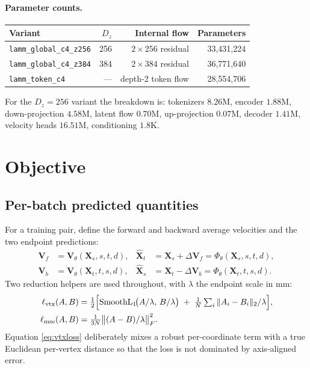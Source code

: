 \documentclass[11pt]{article}
\newcommand{\X}{\bm{X}}
\newcommand{\V}{\bm{V}}
\newcommand{\SL}{\operatorname{SmoothL}_1}
\begin{document}
\paragraph{Parameter counts.}
\begin{center}
\begin{tabular}{lrrr}
\toprule
Variant & $D_z$ & Internal flow & Parameters \\
\midrule
\texttt{lamm\_global\_c4\_z256} & 256 & $2 \times 256$ residual & 33{,}431{,}224 \\
\texttt{lamm\_global\_c4\_z384} & 384 & $2 \times 384$ residual & 36{,}771{,}640 \\
\texttt{lamm\_token\_c4}        & --- & depth-2 token flow      & 28{,}554{,}706 \\
\bottomrule
\end{tabular}
\end{center}
For the $D_z = 256$ variant the breakdown is: tokenizers $8.26$M, encoder $1.88$M,
down-projection $4.58$M, latent flow $0.70$M, up-projection $0.07$M, decoder $1.41$M,
velocity heads $16.51$M, conditioning $1.8$K.

\section{Objective}

\subsection{Per-batch predicted quantities}

For a training pair, define the forward and backward average velocities and the two
endpoint predictions:
\begin{align}
  \V_f &= \V_\theta(\X_s, s, t, d), &
  \widehat{\X}_t &= \X_s + \Delta \V_f = \Phi_\theta(\X_s, s, t, d), \\
  \V_b &= \V_\theta(\X_t, t, s, d), &
  \widehat{\X}_s &= \X_t - \Delta \V_b = \Phi_\theta(\X_t, t, s, d).
\end{align}
Two reduction helpers are used throughout, with $\lambda$ the endpoint scale in mm:
\begin{align}
  \ell_{\mathrm{vtx}}(A, B) &= \tfrac{1}{2}\Bigl[
    \SL\!\bigl(A/\lambda,\, B/\lambda\bigr)
    \;+\; \tfrac{1}{N}\textstyle\sum_{i} \|A_i - B_i\|_2 / \lambda \Bigr],
    \label{eq:vtxloss}\\
  \ell_{\mathrm{mse}}(A, B) &= \tfrac{1}{3N} \bigl\| (A - B)/\lambda \bigr\|_F^2 .
  \label{eq:mseloss}
\end{align}
Equation \eqref{eq:vtxloss} deliberately mixes a robust per-coordinate term with a true
Euclidean per-vertex distance so that the loss is not dominated by axis-aligned error.
\end{document}
